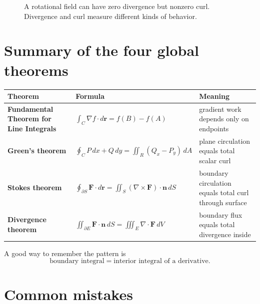 \documentclass[11pt]{article}
\newcommand{\vr}{\mathbf r}
\newcommand{\vn}{\mathbf n}
\newcommand{\vF}{\mathbf F}
\begin{document}
\begin{figure}[H]
\centering
{}
\caption{A rotational field can have zero divergence but nonzero curl. Divergence and curl measure different kinds of behavior.}
\end{figure}

\section{Summary of the four global theorems}

\begin{center}
\begin{tabularx}{\textwidth}{>{\bfseries}lXX}
\toprule
Theorem & Formula & Meaning\\
\midrule
Fundamental Theorem for Line Integrals & $\int_C\nabla f\cdot d\vr=f(B)-f(A)$ & gradient work depends only on endpoints\\
Green's theorem & $\oint_C P\,dx+Q\,dy=\iint_R(Q_x-P_y)\,dA$ & plane circulation equals total scalar curl\\
Stokes theorem & $\oint_{\partial S}\vF\cdot d\vr=\iint_S(\nabla\times\vF)\cdot\vn\,dS$ & boundary circulation equals total curl through surface\\
Divergence theorem & $\iint_{\partial E}\vF\cdot\vn\,dS=\iiint_E\nabla\cdot\vF\,dV$ & boundary flux equals total divergence inside\\
\bottomrule
\end{tabularx}
\end{center}

A good way to remember the pattern is
\[
\boxed{\text{boundary integral}=\text{interior integral of a derivative}.}
\]

\section{Common mistakes}
\end{document}
